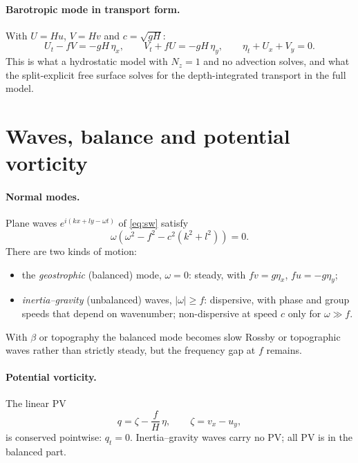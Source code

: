 \documentclass[11pt]{article}
\begin{document}
\paragraph{Barotropic mode in transport form.} With $U=Hu$, $V=Hv$ and $c=\sqrt{gH}$:
\begin{equation}
  U_t - fV = -gH\,\eta_x,\qquad V_t + fU = -gH\,\eta_y,\qquad \eta_t + U_x + V_y = 0.
  \label{eq:sw}
\end{equation}
This is what a hydrostatic model with $N_z=1$ and no advection solves, and what the split-explicit free surface
solves for the depth-integrated transport in the full model.

\section{Waves, balance and potential vorticity}

\paragraph{Normal modes.} Plane waves $e^{i(kx+ly-\omega t)}$ of \eqref{eq:sw} satisfy
\begin{equation}
  \omega\left(\omega^2 - f^2 - c^2(k^2+l^2)\right) = 0 .
\end{equation}
There are two kinds of motion:
\begin{itemize}
  \item the \emph{geostrophic} (balanced) mode, $\omega=0$: steady, with $fv = g\eta_x$, $fu=-g\eta_y$;
  \item \emph{inertia--gravity} (unbalanced) waves, $|\omega|\ge f$: dispersive, with phase and group speeds that
        depend on wavenumber; non-dispersive at speed $c$ only for $\omega\gg f$.
\end{itemize}
With $\beta$ or topography the balanced mode becomes slow Rossby or topographic waves rather than strictly steady,
but the frequency gap at $f$ remains.

\paragraph{Potential vorticity.} The linear PV
\begin{equation}
  q = \zeta - \frac{f}{H}\,\eta,\qquad \zeta = v_x - u_y,
\end{equation}
is conserved pointwise: $q_t = 0$. Inertia--gravity waves carry no PV; all PV is in the balanced part.
\end{document}
